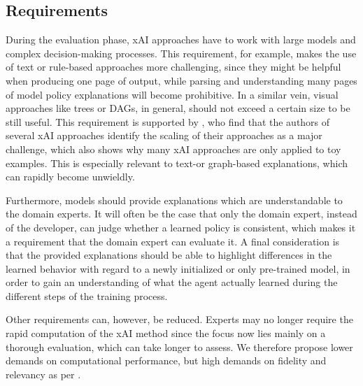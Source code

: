 \documentclass[twoside,11pt]{article}
\begin{document}
\begin{enumerate}

\subsection{Requirements}
During the evaluation phase, xAI approaches have to work with large models and complex decision-making processes. This requirement, for example, makes the use of text or rule-based approaches \citep{TabrezHayes:2019:xRLTextualExplanations,HayesShah:2017:AutonomousPolicyExplanation} more challenging, since they might be helpful when producing one page of output, while parsing and understanding many pages of model policy explanations will become prohibitive. In a similar vein, visual approaches like trees or DAGs, in general, should not exceed a certain size to be still useful. 
This requirement is supported by \citet{WellsBednarz:2021:xAIRLSurvey}, who find that the authors of several xAI approaches identify the scaling of their approaches as a major challenge, which also shows why many xAI approaches are only applied to toy examples. This is especially relevant to text-or graph-based explanations, which can rapidly become unwieldly.

Furthermore, models should provide explanations which are understandable to the domain experts. It will often be the case that only the domain expert, instead of the developer, can judge whether a learned policy is consistent, which makes it a requirement that the domain expert can evaluate it.
A final consideration is that the provided explanations should be able to highlight differences in the learned behavior with regard to a newly initialized or only pre-trained model, in order to gain an understanding of what the agent actually learned during the different steps of the training process.

Other requirements can, however, be reduced. Experts may no longer require the rapid computation of the xAI method since the focus now lies mainly on a thorough evaluation, which can take longer to assess. We therefore propose lower demands on computational performance, but high demands on fidelity and relevancy as per \citet{milani2022survey}.


\end{enumerate}
\end{document}
